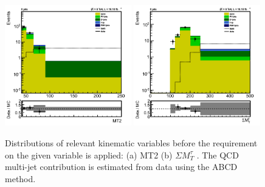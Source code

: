 \begin{figure}[htbp]
\centering
\includegraphics[width=0.49\textwidth]{QCDbginTauTau/Bin1_QCDdatadriven2.png}
\includegraphics[width=0.49\textwidth]{QCDbginTauTau/Bin2_QCDdatadriven2.png} \\
\caption{Distributions of relevant kinematic variables before the requirement on the given variable
is applied: (a) MT2  (b) $\Sigma M_{T}^{\tau}$ . The QCD multi-jet contribution is estimated from data using the ABCD method.}
\label{fig:5QCDbg}
\end{figure}















